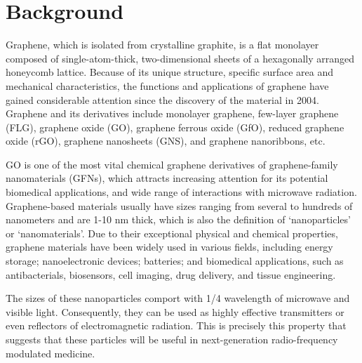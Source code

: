\documentclass[twoside,twocolumn,9pt]{article}
\begin{document}
\section*{}
\vspace{-1cm}







\section{Background}
Graphene, which is isolated from crystalline graphite, is a flat monolayer composed of single-atom-thick, two-dimensional sheets of a hexagonally arranged honeycomb lattice. Because of its unique structure, specific surface area and mechanical characteristics, the functions and applications of graphene have gained considerable attention since the discovery of the material in 2004. Graphene and its derivatives include monolayer graphene, few-layer graphene (FLG), graphene oxide (GO), graphene ferrous oxide (GfO), reduced graphene oxide (rGO), graphene nanosheets (GNS), and graphene nanoribbons, etc. 

GO is one of the most vital chemical graphene derivatives of graphene-family nanomaterials (GFNs), which attracts increasing attention for its potential biomedical applications, and wide range of interactions with microwave radiation. Graphene-based materials usually have sizes ranging from several to hundreds of nanometers and are 1-10 nm thick, which is also the definition of ‘nanoparticles’ or ‘nanomaterials’. Due to their exceptional physical and chemical properties, graphene materials have been widely used in various fields, including energy storage; nanoelectronic devices; batteries; and biomedical applications, such as antibacterials, biosensors, cell imaging, drug delivery, and tissue engineering.

The sizes of these nanoparticles comport with 1/4 wavelength of microwave and visible light. Consequently, they can be used as highly effective transmitters or even reflectors of electromagnetic radiation. This is precisely this property that suggests that these particles will be useful in next-generation radio-frequency modulated medicine.
\end{document}
